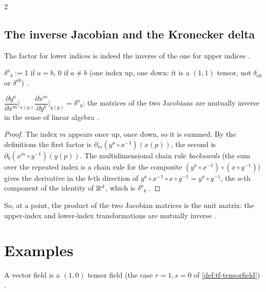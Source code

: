 \begin{paracol}{2}
\subsection{The inverse Jacobian and the Kronecker delta}\label{ssec:tf-delta}

The factor for lower indices is indeed the inverse of the one for upper indices .

\begin{definition}\label{def:tf-kronecker}
$\delta^a{}_b:=1$ if $a=b$, $0$ if $a\ne b$ (one index up, one down: it is a $(1,1)$ tensor,
not $\delta_{ab}$ or $\delta^{ab}$) .
\end{definition}
\begin{theorem}\label{thm:tf-inverse}
$\dfrac{\partial y^a}{\partial x^m}\Big|_{x(p)}\dfrac{\partial x^m}{\partial y^b}\Big|_{y(p)}=\delta^a{}_b$: the matrices of
the two Jacobians are mutually inverse in the sense of linear algebra .
\end{theorem}
\begin{proof}
The index $m$ appears once up, once down, so it is summed. By the definitions the first factor is
$\partial_m(y^a\circ x^{-1})(x(p))$, the second is $\partial_b(x^m\circ y^{-1})(y(p))$. The multidimensional chain rule
\emph{backwards} (the sum over the repeated index is a chain rule for the composite $(y^a\circ x^{-1})\circ(x\circ y^{-1})$) gives
the derivative in the $b$-th direction of $y^a\circ x^{-1}\circ x\circ y^{-1}=y^a\circ y^{-1}$, the $a$-th component of the
identity of $\mathbb{R}^d$, which is $\delta^a{}_b$ .
\end{proof}
So, at a point, the product of the two Jacobian matrices is the unit matrix: the upper-index and lower-index transformations are
mutually inverse .

\section{Examples}\label{sec:tf-examples}

\begin{example}\label{ex:tf-vf-tensor}
A vector field is a $(1,0)$ tensor field (the case $r=1,s=0$ of \cref{def:tf-tensorfield}) .
\end{example}


\end{paracol}
